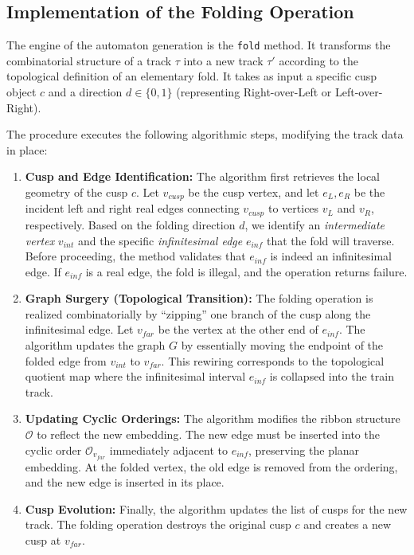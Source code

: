 \subsection{Implementation of the Folding Operation}
\label{subsec:folding_implementation}

The engine of the automaton generation is the \texttt{fold} method. It transforms the combinatorial structure of a track $\tau$ into a new track $\tau'$ according to the topological definition of an elementary fold. It takes as input a specific cusp object $c$ and a direction $d \in \{0, 1\}$ (representing Right-over-Left or Left-over-Right).

The procedure executes the following algorithmic steps, modifying the track data in place:

\begin{enumerate}
    \item \textbf{Cusp and Edge Identification:}
    The algorithm first retrieves the local geometry of the cusp $c$. Let $v_{cusp}$ be the cusp vertex, and let $e_L, e_R$ be the incident left and right real edges connecting $v_{cusp}$ to vertices $v_L$ and $v_R$, respectively.
    Based on the folding direction $d$, we identify an \textit{intermediate vertex} $v_{int}$ and the specific \textit{infinitesimal edge} $e_{inf}$ that the fold will traverse.
    Before proceeding, the method validates that $e_{inf}$ is indeed an infinitesimal edge. If $e_{inf}$ is a real edge, the fold is illegal, and the operation returns failure.

    \item \textbf{Graph Surgery (Topological Transition):}
    The folding operation is realized combinatorially by ``zipping'' one branch of the cusp along the infinitesimal edge. Let $v_{far}$ be the vertex at the other end of $e_{inf}$. The algorithm updates the graph $G$ by essentially moving the endpoint of the folded edge from $v_{int}$ to $v_{far}$. This rewiring corresponds to the topological quotient map where the infinitesimal interval $e_{inf}$ is collapsed into the train track.

    \item \textbf{Updating Cyclic Orderings:}
    The algorithm modifies the ribbon structure $\mathcal{O}$ to reflect the new embedding. The new edge must be inserted into the cyclic order $\mathcal{O}_{v_{far}}$ immediately adjacent to $e_{inf}$, preserving the planar embedding. At the folded vertex, the old edge is removed from the ordering, and the new edge is inserted in its place.

    \item \textbf{Cusp Evolution:}
    Finally, the algorithm updates the list of cusps for the new track. The folding operation destroys the original cusp $c$ and creates a new cusp at $v_{far}$.
\end{enumerate}


